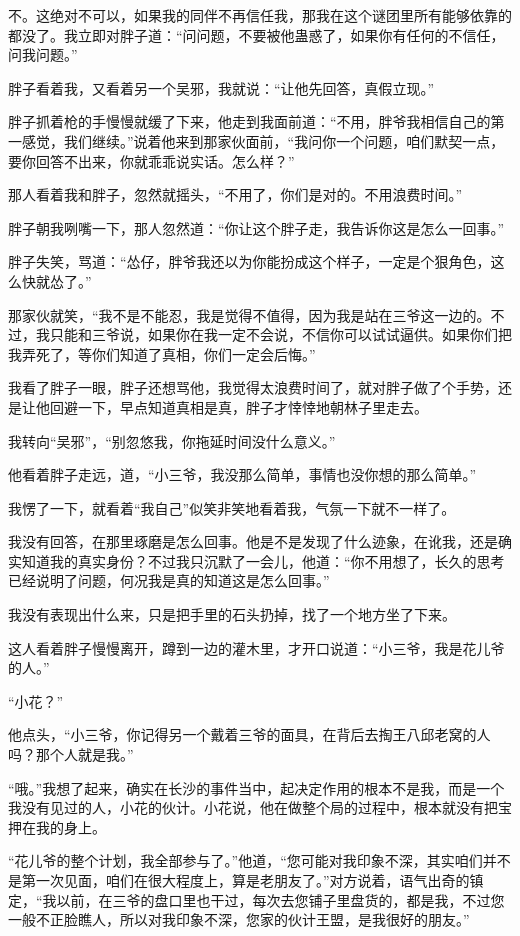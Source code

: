 不。这绝对不可以，如果我的同伴不再信任我，那我在这个谜团里所有能够依靠的都没了。我立即对胖子道：“问问题，不要被他蛊惑了，如果你有任何的不信任，问我问题。”

胖子看着我，又看着另一个吴邪，我就说：“让他先回答，真假立现。”

胖子抓着枪的手慢慢就缓了下来，他走到我面前道：“不用，胖爷我相信自己的第一感觉，我们继续。”说着他来到那家伙面前，“我问你一个问题，咱们默契一点，要你回答不出来，你就乖乖说实话。怎么样？”

那人看着我和胖子，忽然就摇头，“不用了，你们是对的。不用浪费时间。”

胖子朝我咧嘴一下，那人忽然道：“你让这个胖子走，我告诉你这是怎么一回事。”

胖子失笑，骂道：“怂仔，胖爷我还以为你能扮成这个样子，一定是个狠角色，这么快就怂了。”

那家伙就笑，“我不是不能忍，我是觉得不值得，因为我是站在三爷这一边的。不过，我只能和三爷说，如果你在我一定不会说，不信你可以试试逼供。如果你们把我弄死了，等你们知道了真相，你们一定会后悔。”

我看了胖子一眼，胖子还想骂他，我觉得太浪费时间了，就对胖子做了个手势，还是让他回避一下，早点知道真相是真，胖子才悻悻地朝林子里走去。

我转向“吴邪”，“别忽悠我，你拖延时间没什么意义。”

他看着胖子走远，道，“小三爷，我没那么简单，事情也没你想的那么简单。”

我愣了一下，就看着“我自己”似笑非笑地看着我，气氛一下就不一样了。

我没有回答，在那里琢磨是怎么回事。他是不是发现了什么迹象，在讹我，还是确实知道我的真实身份？不过我只沉默了一会儿，他道：“你不用想了，长久的思考已经说明了问题，何况我是真的知道这是怎么回事。”

我没有表现出什么来，只是把手里的石头扔掉，找了一个地方坐了下来。

这人看着胖子慢慢离开，蹲到一边的灌木里，才开口说道：“小三爷，我是花儿爷的人。”

“小花？”

他点头，“小三爷，你记得另一个戴着三爷的面具，在背后去掏王八邱老窝的人吗？那个人就是我。”

“哦。”我想了起来，确实在长沙的事件当中，起决定作用的根本不是我，而是一个我没有见过的人，小花的伙计。小花说，他在做整个局的过程中，根本就没有把宝押在我的身上。

“花儿爷的整个计划，我全部参与了。”他道，“您可能对我印象不深，其实咱们并不是第一次见面，咱们在很大程度上，算是老朋友了。”对方说着，语气出奇的镇定，“我以前，在三爷的盘口里也干过，每次去您铺子里盘货的，都是我，不过您一般不正脸瞧人，所以对我印象不深，您家的伙计王盟，是我很好的朋友。”

